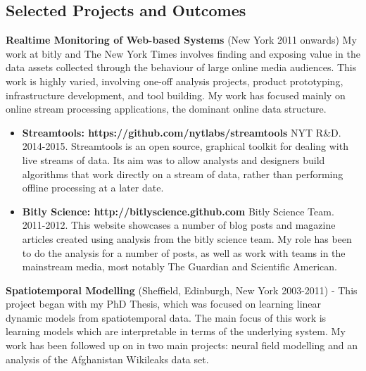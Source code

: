 \documentclass{res}
\begin{document}
\begin{resume}
\section{Selected Projects and Outcomes}
\vspace{1em}
\textbf{Realtime Monitoring of Web-based Systems} (New York 2011 onwards) My work at bitly and The New York Times involves finding and exposing value in the data assets collected through the behaviour of large online media audiences. This work is highly varied, involving one-off analysis projects, product prototyping, infrastructure development, and tool building. My work has focused mainly on online stream processing applications, the dominant online data structure.
\begin{itemize}
    \item \textbf{Streamtools: https://github.com/nytlabs/streamtools} NYT R\&D. 2014-2015. Streamtools is an open source, graphical toolkit for dealing with live streams of data. Its aim was to allow analysts and designers build algorithms that work directly on a stream of data, rather than performing offline processing at a later date.
    \item \textbf{Bitly Science: http://bitlyscience.github.com} Bitly Science Team. 2011-2012. This website showcases a number of blog posts and magazine articles created using analysis from the bitly science team. My role has been to do the analysis for a number of posts, as well as work with teams in the mainstream media, most notably The Guardian and Scientific American.
\end{itemize}
    
    \textbf{Spatiotemporal Modelling} (Sheffield, Edinburgh, New York 2003-2011) - This project began with my PhD Thesis, which was focused on learning linear dynamic models from spatiotemporal data. The main focus of this work is learning models which are interpretable in terms of the underlying system. My work has been followed up on in two main projects: neural field modelling and an analysis of the Afghanistan Wikileaks data set.


\end{resume}
\end{document}
